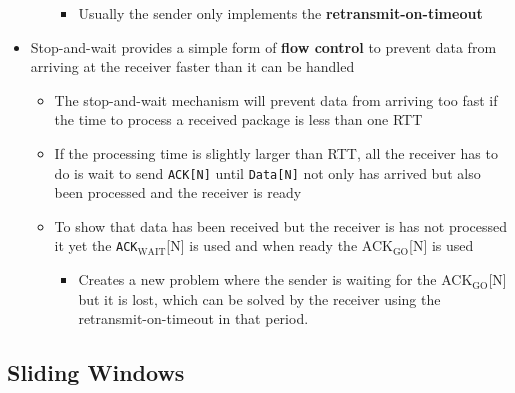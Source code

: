 \documentclass[11pt]{article}
\providecommand{\tightlist}{%
      \setlength{\itemsep}{0pt}\setlength{\parskip}{0pt}}
\begin{document}
\begin{itemize}
\begin{itemize}
    \begin{itemize}
    \tightlist
    \item
      Usually the sender only implements the
      \textbf{retransmit-on-timeout}
    \end{itemize}
  \end{itemize}
\item
  Stop-and-wait provides a simple form of \textbf{flow control} to
  prevent data from arriving at the receiver faster than it can be
  handled

  \begin{itemize}
  \tightlist
  \item
    The stop-and-wait mechanism will prevent data from arriving too fast
    if the time to process a received package is less than one RTT
  \item
    If the processing time is slightly larger than RTT, all the receiver
    has to do is wait to send \texttt{ACK{[}N{]}} until
    \texttt{Data{[}N{]}} not only has arrived but also been processed
    and the receiver is ready
  \item
    To show that data has been received but the receiver is has not
    processed it yet the \texttt{ACK}\(_{\text{WAIT}}\){[}N{]} is used
    and when ready the ACK\(_\text{GO}\){[}N{]} is used

    \begin{itemize}
    \tightlist
    \item
      Creates a new problem where the sender is waiting for the
      ACK\(_\text{GO}\){[}N{]} but it is lost, which can be solved by
      the receiver using the retransmit-on-timeout in that period.
    \end{itemize}
  \end{itemize}
\end{itemize}

    \subsection{Sliding Windows}\label{sliding-windows}
\end{document}
